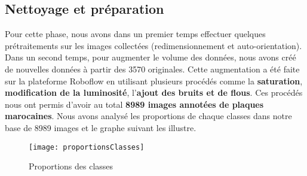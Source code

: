     \subsection{Nettoyage et préparation}
    Pour cette phase, nous avons dans un premier temps effectuer quelques prétraitements sur les images collectées (redimensionnement et auto-orientation). Dans un second temps, pour augmenter le volume des données, nous avons créé de nouvelles données à partir des 3570 originales. Cette augmentation a été faite sur la plateforme Roboflow en utilisant plusieurs procédés comme la \textbf{saturation}, \textbf{modification de la luminosité}, l’\textbf{ajout des bruits et de flous}. Ces procédés nous ont permis d’avoir au total \textbf{8989 images annotées de plaques marocaines}. Nous avons analysé les proportions de chaque classes dans notre base de 8989 images et le graphe suivant les illustre. 
        \begin{figure}[H]
            \centering
            \texttt{[image: proportionsClasses]}
            \caption{Proportions des classes}
        \end{figure}
